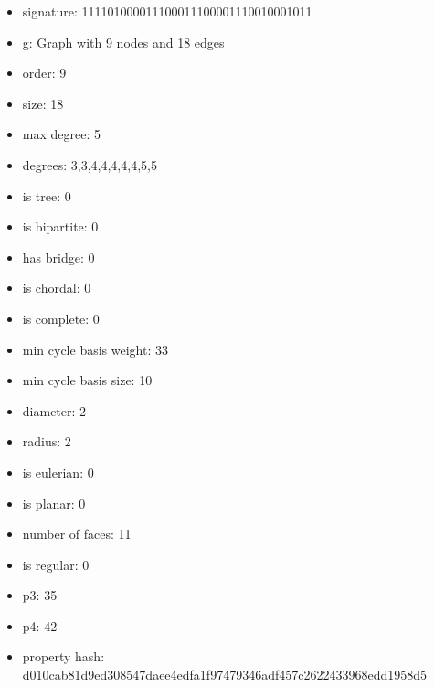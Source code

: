 \newpage
\begin{figure}
\end{figure}
\begin{itemize}
\item signature: 111101000011100011100001110010001011
\item g: Graph with 9 nodes and 18 edges
\item order: 9
\item size: 18
\item max degree: 5
\item degrees: 3,3,4,4,4,4,4,5,5
\item is tree: 0
\item is bipartite: 0
\item has bridge: 0
\item is chordal: 0
\item is complete: 0
\item min cycle basis weight: 33
\item min cycle basis size: 10
\item diameter: 2
\item radius: 2
\item is eulerian: 0
\item is planar: 0
\item number of faces: 11
\item is regular: 0
\item p3: 35
\item p4: 42
\item property hash: d010cab81d9ed308547daee4edfa1f97479346adf457c2622433968edd1958d5
\end{itemize}
